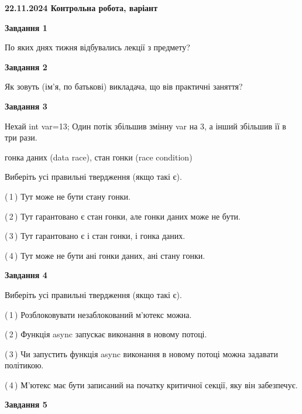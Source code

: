 \documentclass[12pt, ukrainian]{article}
\begin{document}
\begin {large}

\textbf{22.11.2024 Контрольна робота, варіант  }\par


{

\begin{center}
\textbf{Завдання 1}
\end{center}

По яких днях тижня відбувались лекції з предмету?


\begin{center}
\textbf{Завдання 2}
\end{center}

Як зовуть (ім'я, по батькові) викладача, що вів практичні заняття?


\begin{center}
\textbf{Завдання 3}
\end{center}

Нехай int var=13; Один потік збільшив змінну var на 3, а інший збільшив її в три рази.

гонка даних (data race), стан гонки (race condition)

Виберіть усі правильні твердження (якщо такі є).\par
\vspace{2mm}
(\,1\,) Тут може не бути стану гонки.%

(\,2\,) Тут гарантовано є стан гонки, але гонки даних може не бути.%

(\,3\,) Тут гарантовано є і стан гонки, і гонка даних.%

(\,4\,) Тут може не бути ані гонки даних, ані стану гонки.%


\begin{center}
\textbf{Завдання 4}
\end{center}

Виберіть усі правильні твердження (якщо такі є).\par
\vspace{2mm}

(\,1\,) Розблоковувати незаблокований м’ютекс можна.%

(\,2\,) Функція async запускає виконання в новому потоці.%

(\,3\,) Чи запустить функція  async виконання в новому потоці можна задавати політикою.%

(\,4\,) М’ютекс має бути записаний на початку критичної секції, яку він забезпечує.%


\begin{center}
\textbf{Завдання 5}
\end{center}

}
\end{large}
\end{document}
